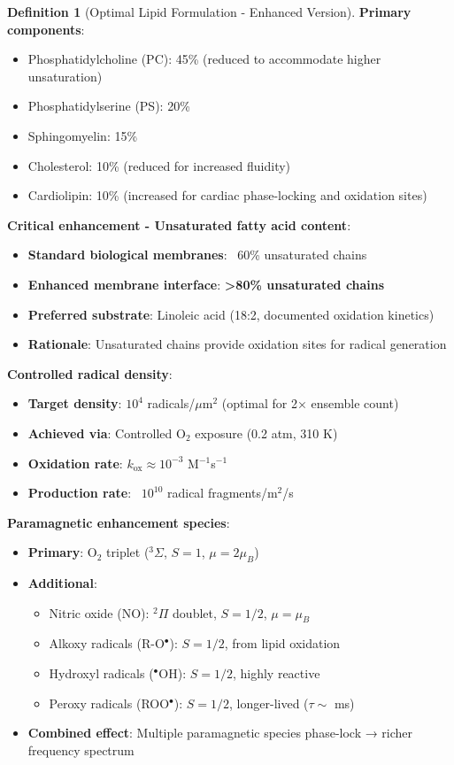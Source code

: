 \documentclass[11pt,a4paper]{article}
\theoremstyle{definition}
\newtheorem{definition}[theorem]{Definition}
\theoremstyle{remark}
\begin{document}
\begin{definition}[Optimal Lipid Formulation - Enhanced Version]
\textbf{Primary components}:
\begin{itemize}
\item Phosphatidylcholine (PC): 45\% (reduced to accommodate higher unsaturation)
\item Phosphatidylserine (PS): 20\%
\item Sphingomyelin: 15\%
\item Cholesterol: 10\% (reduced for increased fluidity)
\item Cardiolipin: 10\% (increased for cardiac phase-locking and oxidation sites)
\end{itemize}

\textbf{Critical enhancement - Unsaturated fatty acid content}:
\begin{itemize}
\item \textbf{Standard biological membranes}: ~60\% unsaturated chains
\item \textbf{Enhanced membrane interface}: \textbf{>80\% unsaturated chains}
\item \textbf{Preferred substrate}: Linoleic acid (18:2, documented oxidation kinetics)
\item \textbf{Rationale}: Unsaturated chains provide oxidation sites for radical generation
\end{itemize}

\textbf{Controlled radical density}:
\begin{itemize}
\item \textbf{Target density}: $10^4$ radicals/$\mu$m$^2$ (optimal for 2× ensemble count)
\item \textbf{Achieved via}: Controlled O$_2$ exposure (0.2 atm, 310 K)
\item \textbf{Oxidation rate}: $k_{\text{ox}} \approx 10^{-3}$ M$^{-1}$s$^{-1}$
\item \textbf{Production rate}: ~$10^{10}$ radical fragments/m$^2$/s
\end{itemize}

\textbf{Paramagnetic enhancement species}:
\begin{itemize}
\item \textbf{Primary}: O$_2$ triplet ($^3\Sigma$, $S=1$, $\mu = 2\mu_B$)
\item \textbf{Additional}:
\begin{itemize}
\item Nitric oxide (NO): $^2\Pi$ doublet, $S=1/2$, $\mu = \mu_B$
\item Alkoxy radicals (R-O$^\bullet$): $S=1/2$, from lipid oxidation
\item Hydroxyl radicals ($^\bullet$OH): $S=1/2$, highly reactive
\item Peroxy radicals (ROO$^\bullet$): $S=1/2$, longer-lived ($\tau \sim$ ms)
\end{itemize}
\item \textbf{Combined effect}: Multiple paramagnetic species phase-lock → richer frequency spectrum
\end{itemize}


\end{definition}
\end{document}
